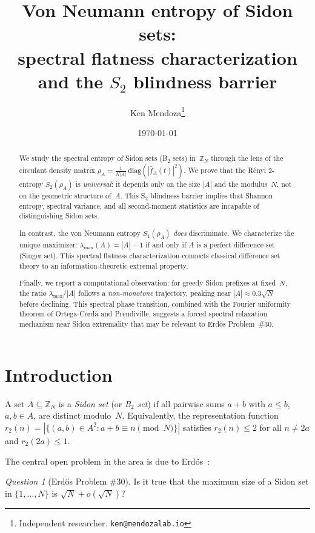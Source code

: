 \documentclass[11pt]{article}
\title{Von Neumann entropy of Sidon sets:\\
spectral flatness characterization and the $S_2$ blindness barrier}
\author{Ken Mendoza\thanks{Independent researcher. \texttt{ken@mendozalab.io}}}
\date{\today}
\theoremstyle{definition}
\theoremstyle{remark}
\newtheorem{question}[theorem]{Question}
\newcommand{\Z}{\mathbb{Z}}
\newcommand{\fhat}{\widehat{f}}
\newcommand{\lmax}{\lambda_{\max}}
\begin{document}
\maketitle

\begin{abstract}
We study the spectral entropy of Sidon sets (B$_2$ sets) in~$\Z_N$
through the lens of the circulant density matrix
$\rho_A = \frac{1}{N|A|}\,\text{diag}(|\fhat_A(t)|^2)$.
We prove that the R\'enyi $2$-entropy $S_2(\rho_A)$
is \emph{universal}: it depends only on the size $|A|$ and the
modulus~$N$, not on the geometric structure of~$A$.
This S$_2$ blindness barrier implies that Shannon entropy, spectral
variance, and all second-moment statistics are
incapable of distinguishing Sidon sets.

In contrast, the von Neumann entropy $S_1(\rho_A)$ \emph{does}
discriminate.  We characterize the unique maximizer:
$\lmax(A) = |A|-1$ if and only if $A$ is a perfect difference set
(Singer set).  This spectral flatness characterization connects
classical difference set theory to an information-theoretic extremal
property.

Finally, we report a computational observation: for greedy Sidon
prefixes at fixed~$N$, the ratio $\lmax/|A|$ follows a
\emph{non-monotone} trajectory, peaking near $|A| \approx 0.3\sqrt{N}$
before declining.  This spectral phase transition, combined with the
Fourier uniformity theorem of Ortega-Cerd\`a and Prendiville, suggests
a forced spectral relaxation mechanism near Sidon extremality that
may be relevant to Erd\H{o}s Problem~\#30.
\end{abstract}

\section{Introduction}\label{sec:intro}

A set $A \subseteq \Z_N$ is a \emph{Sidon set} (or \emph{B$_2$ set})
if all pairwise sums $a + b$ with $a \le b$, $a,b \in A$, are
distinct modulo~$N$.  Equivalently, the representation function
$r_2(n) = |\{(a,b) \in A^2 : a + b \equiv n \pmod{N}\}|$ satisfies
$r_2(n) \le 2$ for all $n \ne 2a$ and $r_2(2a) \le 1$.

The central open problem in the area is due to Erd\H{o}s~\cite{ET1941}:

\begin{question}[Erd\H{o}s Problem \#30]
Is it true that the maximum size of a Sidon set in $\{1,\ldots,N\}$
is $\sqrt{N} + o(\sqrt{N})$?
\end{question}
\end{document}
